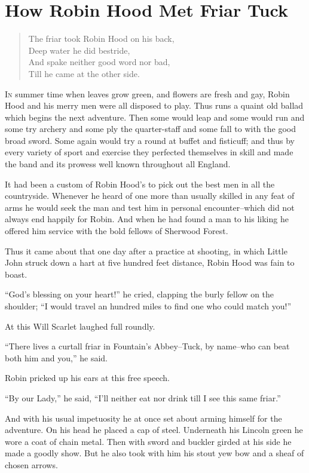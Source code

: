 \chapter{How Robin Hood Met Friar Tuck}

\begin{quote}
The friar took Robin Hood on his back,\\
Deep water he did bestride,\\
And spake neither good word nor bad,\\
Till he came at the other side.
\end{quote}

\lettrine{I}{n} summer time when leaves grow green, and flowers are fresh and gay,
Robin Hood and his merry men were all disposed to play. Thus runs a
quaint old ballad which begins the next adventure. Then some would leap
and some would run and some try archery and some ply the quarter-staff
and some fall to with the good broad sword. Some again would try a round
at buffet and fisticuff; and thus by every variety of sport and exercise
they perfected themselves in skill and made the band and its prowess
well known throughout all England.

It had been a custom of Robin Hood's to pick out the best men in all the
countryside. Whenever he heard of one more than usually skilled in any
feat of arms he would seek the man and test him in personal
encounter--which did not always end happily for Robin. And when he had
found a man to his liking he offered him service with the bold fellows
of Sherwood Forest.

Thus it came about that one day after a practice at shooting, in which
Little John struck down a hart at five hundred feet distance, Robin Hood
was fain to boast.

``God's blessing on your heart!'' he cried, clapping the burly fellow on
the shoulder; ``I would travel an hundred miles to find one who could
match you!''

At this Will Scarlet laughed full roundly.

``There lives a curtall friar in Fountain's Abbey--Tuck, by name--who
can beat both him and you,'' he said.

Robin pricked up his ears at this free speech.

``By our Lady,'' he said, ``I'll neither eat nor drink till I see this
same friar.''

And with his usual impetuosity he at once set about arming himself for
the adventure. On his head he placed a cap of steel. Underneath his
Lincoln green he wore a coat of chain metal. Then with sword and buckler
girded at his side he made a goodly show. But he also took with him his
stout yew bow and a sheaf of chosen arrows.

